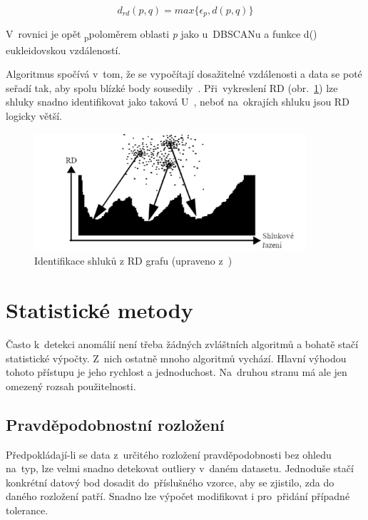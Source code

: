 \begin{equation}
\label{rd-rovnice}
d_{rd}(p,q) = max\{\epsilon_p, d(p,q)\}
\end{equation}

V~rovnici je opět \textepsilon\textsubscript{p}\space poloměrem oblasti \emph{p} jako u~DBSCANu a funkce d() eukleidovskou vzdáleností.

Algoritmus spočívá v~tom, že se vypočítají dosažitelné vzdálenosti a data se poté seřadí tak, aby spolu blízké body sousedily~\cite{optics}. Při~vykreslení RD (obr.~\ref{optics-img}) lze shluky snadno identifikovat jako taková U~\cite{optics}, neboť na~okrajích shluku jsou RD logicky větší.

\begin{figure}[hbt]
	\centering
	\includegraphics[width=0.9\textwidth]{obrazky/optics.pdf}
	\caption{Identifikace shluků z RD grafu (upraveno z~\cite{optics})}
	\label{optics-img}
\end{figure}

\section{Statistické metody}
Často k~detekci anomálií není třeba žádných zvláštních algoritmů a bohatě stačí statistické výpočty. Z~nich ostatně mnoho algoritmů vychází. Hlavní výhodou tohoto přístupu je jeho rychlost a jednoduchost. Na~druhou stranu má ale jen omezený rozsah použitelnosti.

\subsection{Pravděpodobnostní rozložení}
Předpokládají-li se data z~určitého rozložení pravděpodobnosti bez ohledu na~typ, lze velmi snadno detekovat outliery v~daném datasetu. Jednoduše stačí konkrétní datový bod dosadit do~příslušného vzorce, aby se zjistilo, zda do daného rozložení patří. Snadno lze výpočet modifikovat i pro~přidání případné tolerance.

